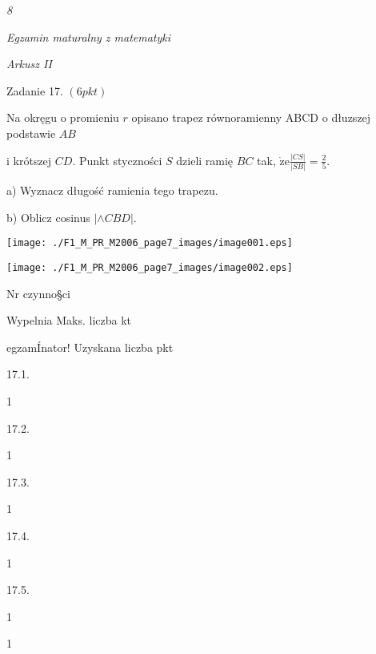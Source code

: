 \documentclass[a4paper,12pt]{article}
\begin{document}
{\it 8}

{\it Egzamin maturalny z matematyki}

{\it Arkusz II}

Zadanie 17. $(6pkt)$

Na okręgu o promieniu $r$ opisano trapez równoramienny ABCD o dłuzszej podstawie $AB$

i krótszej $CD$. Punkt styczności $S$ dzieli ramię $BC$ tak, $\displaystyle \dot{\mathrm{z}}\mathrm{e}\frac{|CS|}{|SB|}=\frac{2}{5}.$

a) Wyznacz długość ramienia tego trapezu.

b) Oblicz cosinus $|\wedge CBD|.$
\begin{center}
\texttt{[image: ./F1\_M\_PR\_M2006\_page7\_images/image001.eps]}

\texttt{[image: ./F1\_M\_PR\_M2006\_page7\_images/image002.eps]}
\end{center}
Nr czynno\S ci

Wypelnia Maks. liczba kt

egzamÍnator! Uzyskana liczba pkt

17.1.

1

17.2.

1

17.3.

1

17.4.

1

17.5.

1

1
\end{document}

